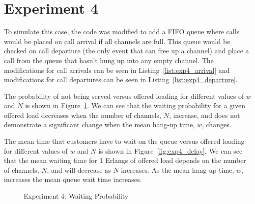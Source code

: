 \section*{Experiment 4}
To simulate this case, the code was modified to add a FIFO queue where calls would be placed on call arrival if all channels are full. This queue would be checked on call departure (the only event that can free up a channel) and place a call from the queue that hasn't hung up into any empty channel. The modifications for call arrivals can be seen in Listing~\ref{list:exp4_arrival} and modifications for call departures can be seen in Listing~\ref{list:exp4_departure}.

The probability of not being served versus offered loading for different values of $w$ and $N$ is shown in Figure~\ref{fig:exp4_prob}. We can see that the waiting probability for a given offered load decreases when the number of channels, $N$, increase, and does not demonstrate a significant change when the mean hang-up time, $w$, changes.

The mean time that customers have to wait on the queue versus offered loading for different values of $w$ and $N$ is shown in Figure~\ref{fig:exp4_delay}. We can see that the mean waiting time for 1 Erlangs of offered load depends on the number of channels, $N$, and will decrease as $N$ increases. As the mean hang-up time, $w$, increases the mean queue wait time increases.

\begin{figure}[ht]
\centering
\captionsetup{justification=centering}
\caption{Experiment 4: Waiting Probability}
\label{fig:exp4_prob}
\end{figure}
\clearpage

